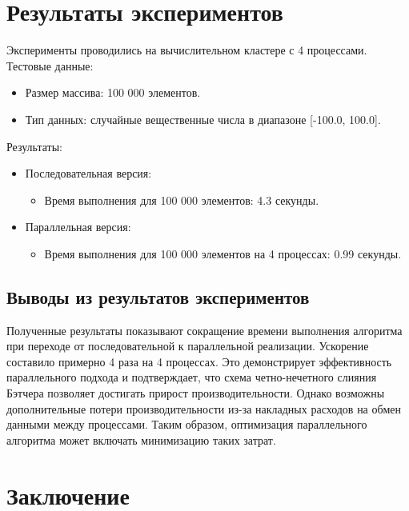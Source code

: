 \documentclass[a4paper,12pt]{article}
\begin{document}
\newpage

\section*{\centering Результаты экспериментов}

Эксперименты проводились на вычислительном кластере с 4 процессами. Тестовые данные:
\begin{itemize}
    \item Размер массива: 100 000 элементов.
    \item Тип данных: случайные вещественные числа в диапазоне [-100.0, 100.0].
\end{itemize}

Результаты:
\begin{itemize}
    \item Последовательная версия:
    \begin{itemize}
        \item Время выполнения для 100 000 элементов: 4.3 секунды.
    \end{itemize}
    \item Параллельная версия:
    \begin{itemize}
        \item Время выполнения для 100 000 элементов на 4 процессах: 0.99 секунды.
    \end{itemize}
\end{itemize}

\subsection*{Выводы из результатов экспериментов}

Полученные результаты показывают сокращение времени выполнения алгоритма при переходе от последовательной к параллельной реализации. Ускорение составило примерно 4 раза на 4 процессах. Это демонстрирует эффективность параллельного подхода и подтверждает, что схема четно-нечетного слияния Бэтчера позволяет достигать прирост производительности. Однако возможны дополнительные потери производительности из-за накладных расходов на обмен данными между процессами. Таким образом, оптимизация параллельного алгоритма может включать минимизацию таких затрат.

\newpage

\section*{\centering Заключение}
\end{document}
